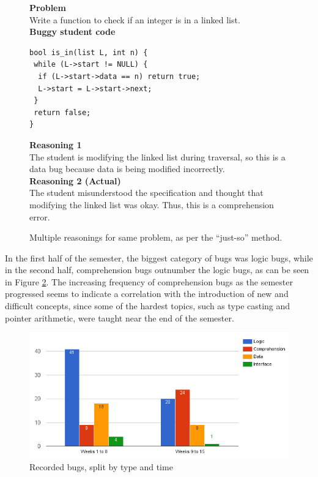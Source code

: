 \documentclass{sig-alternate}
\begin{document}
\begin{figure}
\begin{framed}
\setlength{\parindent}{0cm}
\textbf{Problem}\\
Write a function to check if an integer is in a linked list.\\

\textbf{Buggy student code}
\vspace{-0.05in}
\begin{verbatim}
bool is_in(list L, int n) {
 while (L->start != NULL) {
  if (L->start->data == n) return true;
  L->start = L->start->next;
 }
 return false;
}
\end{verbatim}

\textbf{Reasoning 1}\\
The student is modifying the linked list during traversal, so this is a data bug because data is being modified incorrectly.\\

\textbf{Reasoning 2 (Actual)}\\
The student misunderstood the specification and thought that modifying the linked list was okay. Thus, this is a comprehension error.
\end{framed}
\vspace{-0.1in}
\caption{Multiple reasonings for same problem, as per the ``just-so'' method.}
\label{fig:incorrect}
\end{figure}

In the first half of the semester, the biggest category of bugs was logic bugs, while in the second half, comprehension bugs outnumber the logic bugs, as can be seen in Figure \ref{fig:types}. The increasing frequency of comprehension bugs as the semester progressed seems to indicate a correlation with the introduction of new and difficult concepts, since some of the hardest topics, such as type casting and pointer arithmetic, were taught near the end of the semester.\\

\begin{figure}
\centering
\includegraphics[scale=0.38]{figures/types.png}
\caption{Recorded bugs, split by type and time}
\label{fig:types}
\end{figure}
\end{document}
